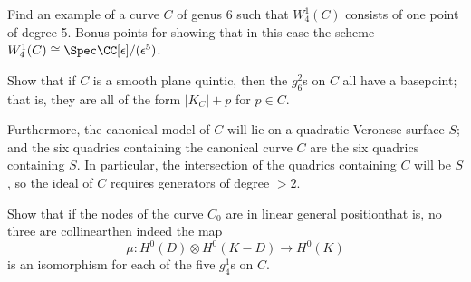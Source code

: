 \begin{exercise}
Find an example of a curve $C$ of genus 6 such that $W^1_4(C)$ consists
of one point of degree 5. Bonus points for showing that in this case
the scheme $W^1_4(C) \cong \Spec \CC[\epsilon]/(\epsilon^5)$.
\end{exercise}

\begin{exercise}
Show that if $C$ is a smooth plane quintic, then the $g^2_6$s on $C$
all have a basepoint; that is, they are all of the form $|K_C| + p$
for $p \in C$.

Furthermore, the canonical model of $C$ will lie on a quadratic Veronese
surface $S$; and the six
quadrics containing the canonical curve $C$ are the six quadrics
containing $S$.
In particular, the intersection of the quadrics containing
$C$ will be $S$, so
the ideal of $C$ requires generators of degree $>2$.
\end{exercise}

\begin{exercise}\label{nonreduced Wrd}
Show that if the nodes of the curve $C_0$ are in linear general
position\emdash that is, no three
are
collinear\emdash then indeed the map
$$\mu : H^0(D) \otimes H^0(K-D) \to H^0(K)$$ is an isomorphism for each
of the five $g^1_4$s on $C$.
\end{exercise}

